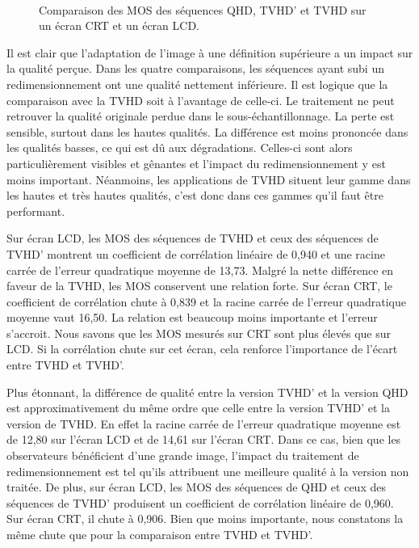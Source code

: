 \begin{figure}[htbp]
{}\hfill
	\\
	\caption{Comparaison des MOS des séquences QHD, TVHD' et TVHD sur un écran CRT et un écran LCD.}
\end{figure}

Il est clair que l'adaptation de l'image à une définition supérieure a un impact sur la qualité perçue. Dans les quatre comparaisons, les séquences ayant subi un redimensionnement ont une qualité nettement inférieure. Il est logique que la comparaison avec la TVHD soit à l'avantage de celle-ci. Le traitement ne peut retrouver la qualité originale perdue dans le sous-échantil\-lon\-nage. La perte est sensible, surtout dans les hautes qualités. La différence est moins prononcée dans les qualités basses, ce qui est dû aux dégradations. Celles-ci sont alors particulièrement visibles et gênantes et l'impact du redimensionnement y est moins important. Néanmoins, les applications de TVHD situent leur gamme dans les hautes et très hautes qualités, c'est donc dans ces gammes qu'il faut être performant.

Sur écran LCD, les MOS des séquences de TVHD et ceux des séquences de TVHD' montrent un coefficient de corrélation linéaire de 0,940 et une racine carrée de l'erreur quadratique moyenne de 13,73. Malgré la nette différence en faveur de la TVHD, les MOS conservent une relation forte. Sur écran CRT, le coefficient de corrélation chute à 0,839 et la racine carrée de l'erreur quadratique moyenne vaut 16,50. La relation est beaucoup moins importante et l'erreur s'accroit. Nous savons que les MOS mesurés sur CRT sont plus élevés que sur LCD. Si la corrélation chute sur cet écran, cela renforce l'importance de l'écart entre TVHD et TVHD'.

Plus étonnant, la différence de qualité entre la version TVHD' et la version QHD est approximativement du même ordre que celle entre la version TVHD' et la version de TVHD. En effet la racine carrée de l'erreur quadratique moyenne est de 12,80 sur l'écran LCD et de 14,61 sur l'écran CRT. Dans ce cas, bien que les observateurs bénéficient d'une grande image, l'impact du traitement de redimensionnement est tel qu'ils attribuent une meilleure qualité à la version non traitée. De plus, sur écran LCD, les MOS des séquences de QHD et ceux des séquences de TVHD' produisent un coefficient de corrélation linéaire de 0,960. Sur écran CRT, il chute à 0,906. Bien que moins importante, nous constatons la même chute que pour la comparaison entre TVHD et TVHD'.

